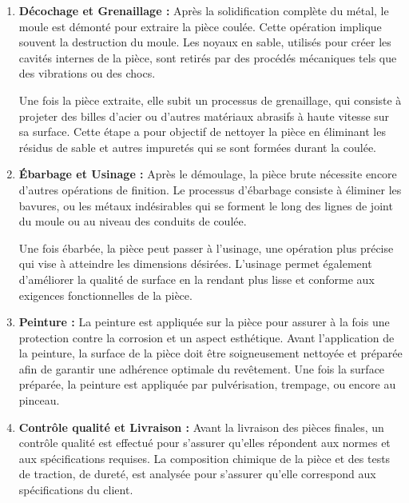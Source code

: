\documentclass[12pt]{article}
\begin{document}
\begin{enumerate}
    

    \item \textbf{Décochage et Grenaillage :} Après la solidification 
    complète du métal, le moule est démonté pour extraire la pièce coulée. 
    Cette opération implique souvent la destruction du moule. Les noyaux 
    en sable, utilisés pour créer les cavités internes de la pièce, sont 
    retirés par des procédés mécaniques tels que des vibrations ou des chocs.

    Une fois la pièce extraite, elle subit un processus de grenaillage, 
    qui consiste à projeter des billes d'acier ou d'autres matériaux 
    abrasifs à haute vitesse sur sa surface. Cette étape a pour objectif 
    de nettoyer la pièce en éliminant les résidus de sable et autres 
    impuretés qui se sont formées durant la coulée. 
    
    \item \textbf{Ébarbage et Usinage :} Après le démoulage, la pièce 
    brute nécessite encore d'autres opérations de finition. Le processus 
    d'ébarbage consiste à éliminer les bavures, ou les métaux 
    indésirables qui se forment le long des lignes de joint du moule ou 
    au niveau des conduits de coulée. 

    Une fois ébarbée, la pièce peut passer à l'usinage, une opération plus 
    précise qui vise à atteindre les dimensions désirées. L'usinage permet 
    également d'améliorer la qualité de surface en la rendant plus lisse 
    et conforme aux exigences fonctionnelles de la pièce. 

    \item \textbf{Peinture :} La peinture est appliquée sur la pièce pour 
    assurer à la fois une protection contre la corrosion et un aspect 
    esthétique. Avant l'application de la peinture, la surface de la pièce 
    doit être soigneusement nettoyée et préparée afin de garantir une 
    adhérence optimale du revêtement. Une fois la surface préparée, la 
    peinture est appliquée par pulvérisation, trempage, ou encore au 
    pinceau.

    \item \textbf{Contrôle qualité et Livraison :} Avant la livraison des 
    pièces finales, un contrôle qualité est effectué pour s'assurer 
    qu'elles répondent aux normes et aux spécifications requises. La 
    composition chimique de la pièce et des tests de traction, de dureté, est analysée pour 
    s'assurer qu'elle correspond aux spécifications du client. 
\end{enumerate}
\end{document}
